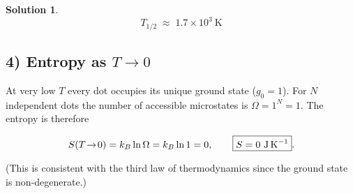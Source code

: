 \documentclass[12pt]{article}
\theoremstyle{definition} %
\newtheorem{solution}{Solution}
\theoremstyle{plain} %
\begin{document}
\begin{solution}
            \[
            \boxed{\,T_{1/2}\;\approx\;1.7\times10^{3}\ \text{K}\,}
            \]
            
            \subsection*{4)  Entropy as \(T\to 0\)}
            
            At very low \(T\) every dot occupies its unique ground state
            (\(g_0=1\)).  
            For \(N\) independent dots the number of accessible microstates is
            \(\Omega = 1^{N}=1\).  
            The entropy is therefore
            
            \[
            S(T\!\to\!0) = k_B \ln \Omega = k_B\ln 1 = 0,
            \qquad
            \boxed{S = 0\ \text{J\,K}^{-1}}.
            \]
            
            (This is consistent with the third law of thermodynamics since the
            ground state is non-degenerate.)
            \end{solution}
\end{document}

